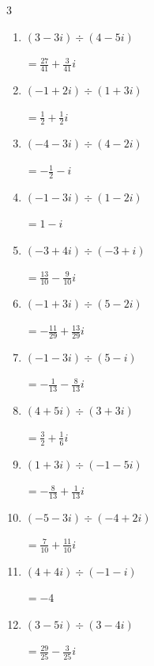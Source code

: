 \begin{multicols}{3}
\begin{enumerate}
        $\displaystyle =1-i$

  \item $\displaystyle (3-3i)\div(4-5i)$

        $\displaystyle =\frac{27}{41}+\frac{3}{41}i$

  \item $\displaystyle (-1+2i)\div(1+3i)$

        $\displaystyle =\frac{1}{2}+\frac{1}{2}i$

\columnbreak %

  \item $\displaystyle (-4-3i)\div(4-2i)$

        $\displaystyle =-\frac{1}{2}-i$

  \item $\displaystyle (-1-3i)\div(1-2i)$

        $\displaystyle =1-i$

  \item $\displaystyle (-3+4i)\div(-3+i)$

        $\displaystyle =\frac{13}{10}-\frac{9}{10}i$

  \item $\displaystyle (-1+3i)\div(5-2i)$

        $\displaystyle =-\frac{11}{29}+\frac{13}{29}i$

  \item $\displaystyle (-1-3i)\div(5-i)$

        $\displaystyle =-\frac{1}{13}-\frac{8}{13}i$

  \item $\displaystyle (4+5i)\div(3+3i)$

        $\displaystyle =\frac{3}{2}+\frac{1}{6}i$

  \item $\displaystyle (1+3i)\div(-1-5i)$

        $\displaystyle =-\frac{8}{13}+\frac{1}{13}i$

  \item $\displaystyle (-5-3i)\div(-4+2i)$

        $\displaystyle =\frac{7}{10}+\frac{11}{10}i$

  \item $\displaystyle (4+4i)\div(-1-i)$

        $\displaystyle =-4$

  \item $\displaystyle (3-5i)\div(3-4i)$

        $\displaystyle =\frac{29}{25}-\frac{3}{25}i$


\end{enumerate}
\end{multicols}
